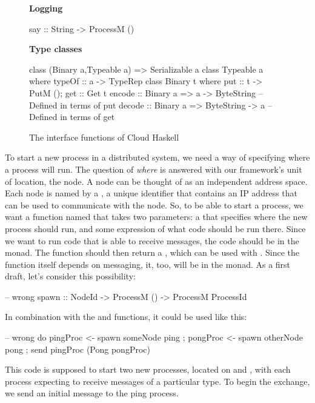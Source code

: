 \documentclass[preprint]{sigplanconf}
\begin{document}
\begin{figure}[t!]
 \textbf{Logging}
\begin{code}
say :: String -> ProcessM ()
\end{code}

 \textbf{Type classes}
\begin{code}
class (Binary a,Typeable a) => Serializable a
class Typeable a where typeOf :: a -> TypeRep
class Binary t where { put :: t -> PutM (); get :: Get t }
encode :: Binary a => a -> ByteString
  -- Defined in terms of put
decode :: Binary a => ByteString -> a
  -- Defined in terms of get
\end{code}
\caption{The interface functions of Cloud Haskell%
\label{fig:api}}
\end{figure}


To start a new process in a distributed system, we need a way of specifying where a process will run. The question of {\em where} is answered with our framework's unit of location, the node. A node can be thought of as an independent address space. Each node is named by a , a unique identifier that contains an IP address that can be used to communicate with the node. So, to be able to start a process, we want a function named  that takes two parameters: a  that specifies where the new process should run, and some expression of what code should be run there. Since we want to run code that is able to receive messages, the code should be in the  monad. The  function should then return a , which can be used with .  Since the  function itself depends on messaging, it, too, will be in the  monad. As a first draft, let's consider this possibility:

\begin{code}
-- wrong
spawn :: NodeId -> ProcessM () -> ProcessM ProcessId
\end{code}

In combination with the  and  functions, it could be used like this:

\begin{code}
-- wrong
do { pingProc <- spawn someNode ping
   ; pongProc <- spawn otherNode pong
   ; send pingProc (Pong pongProc) }
\end{code}

This code is supposed to start two new processes, located on  and , with each process expecting to receive messages of a particular type. To begin the exchange, we send an initial  message to the ping process.
\end{document}
